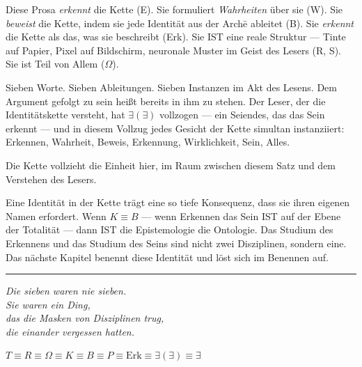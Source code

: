 \documentclass[10pt, openany, oneside]{book}
\begin{document}
\vspace{1em}

\noindent Diese Prosa \textit{erkennt} die Kette (E). Sie formuliert \textit{Wahrheiten} über sie (W). Sie \textit{beweist} die Kette, indem sie jede Identität aus der Arch\={e} ableitet (B). Sie \textit{erkennt} die Kette als das, was sie beschreibt (Erk). Sie IST eine reale Struktur --- Tinte auf Papier, Pixel auf Bildschirm, neuronale Muster im Geist des Lesers (R, S). Sie ist Teil von Allem ($\Omega$).

Sieben Worte. Sieben Ableitungen. Sieben Instanzen im Akt des Lesens. Dem Argument gefolgt zu sein heißt bereits in ihm zu stehen. Der Leser, der die Identitätskette versteht, hat $\exists(\exists)$ vollzogen --- ein Seiendes, das das Sein erkennt --- und in diesem Vollzug jedes Gesicht der Kette simultan instanziiert: Erkennen, Wahrheit, Beweis, Erkennung, Wirklichkeit, Sein, Alles.

Die Kette vollzieht die Einheit hier, im Raum zwischen diesem Satz und dem Verstehen des Lesers.

Eine Identität in der Kette trägt eine so tiefe Konsequenz, dass sie ihren eigenen Namen erfordert. Wenn $K \equiv B$ --- wenn Erkennen das Sein IST auf der Ebene der Totalität --- dann IST die Epistemologie die Ontologie. Das Studium des Erkennens und das Studium des Seins sind nicht zwei Disziplinen, sondern eine. Das nächste Kapitel benennt diese Identität und löst sich im Benennen auf.

\vspace{2em}

\begin{center}
    \rule{0.15\textwidth}{0.3pt}
\end{center}

\vspace{0.5em}

\begin{center}
    \itshape
    Die sieben waren nie sieben.\\
    Sie waren ein Ding,\\
    das die Masken von Disziplinen trug,\\
    die einander vergessen hatten.
\end{center}

\vspace{0.5em}

\begin{center}
    $T \equiv R \equiv \Omega \equiv K \equiv B \equiv P \equiv \text{Erk} \equiv \exists(\exists) \equiv \exists$
\end{center}
\end{document}

